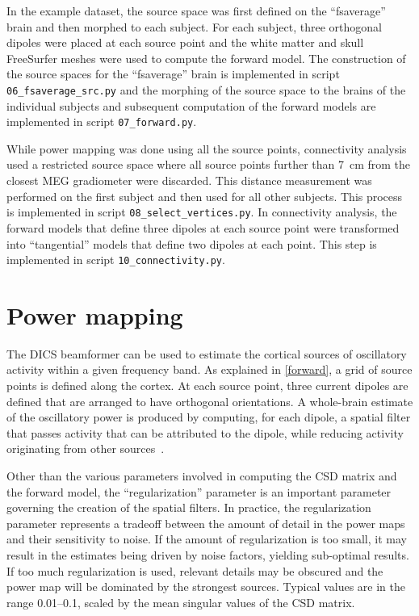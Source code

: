 \documentclass[utf8]{frontiersSCNS}
\renewcommand{\cite}[1]{~\citep{#1}}
\newcommand{\code}[1]{\lstinline{#1}}
\begin{document}
In the example dataset, the source space was first defined on the ``fsaverage'' brain and then morphed to each subject.
For each subject, three orthogonal dipoles were placed at each source point and the white matter and skull FreeSurfer meshes were used to compute the forward model. 
The construction of the source spaces for the ``fsaverage'' brain is implemented in script \code{06_fsaverage_src.py} and the morphing of the source space to the brains of the individual subjects and subsequent computation of the forward models are implemented in script \code{07_forward.py}.

While power mapping was done using all the source points, connectivity analysis used a restricted source space where all source points further than \SI{7}{\centi\meter} from the closest MEG gradiometer were discarded.
This distance measurement was performed on the first subject and then used for all other subjects.
This process is implemented in script \code{08_select_vertices.py}.
In connectivity analysis, the forward models that define three dipoles at each source point were transformed into ``tangential'' models that define two dipoles at each point.
This step is implemented in script \code{10_connectivity.py}.

\section{Power mapping}\label{power}

The DICS beamformer can be used to estimate the cortical sources of oscillatory activity within a given frequency band.
As explained in \autoref{forward}, a grid of source points is defined along the cortex.
At each source point, three current dipoles are defined that are arranged to have orthogonal orientations.
A whole-brain estimate of the oscillatory power is produced by computing, for each dipole, a spatial filter that passes activity that can be attributed to the dipole, while reducing activity originating from other sources\cite{VanVeen1997}.

Other than the various parameters involved in computing the CSD matrix and the forward model, the ``regularization'' parameter is an important parameter governing the creation of the spatial filters.
In practice, the regularization parameter represents a tradeoff between the amount of detail in the power maps and their sensitivity to noise.
If the amount of regularization is too small, it may result in the estimates being driven by noise factors, yielding sub-optimal results. If too much regularization is used, relevant details may be obscured and the power map will be dominated by the strongest sources.
Typical values are in the range 0.01--0.1, scaled by the mean singular values of the CSD matrix.
\end{document}

